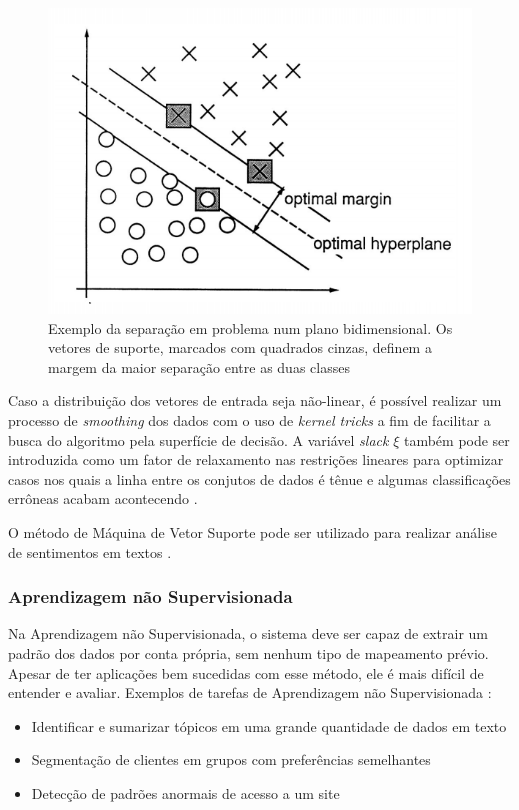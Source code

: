 \documentclass[
	12pt,				%
	openright,			%
	oneside,			%
	a4paper,			%
	english,			%
	spanish,			%
	brazil				%
	]{abntex2}
\begin{document}
\begin{figure}[!htb]
\centering
\includegraphics[scale=0.5]{svm_distribution}
\caption{Exemplo da separação em problema num plano bidimensional. Os vetores de suporte, marcados com quadrados cinzas, definem a margem da maior separação entre as duas classes \cite{cortes}}
\label{svm}
\end{figure}

	Caso a distribuição dos vetores de entrada seja não-linear, é possível realizar um processo de \emph{smoothing} dos dados com o uso de \emph{kernel tricks} a fim de facilitar a busca do algoritmo pela superfície de decisão. A variável \emph{slack} $\xi$ também pode ser introduzida como um fator de relaxamento nas restrições lineares para optimizar casos nos quais a linha entre os conjutos de dados é tênue e algumas classificações errôneas acabam acontecendo \cite{r_julian_heart}.
	
	O método de Máquina de Vetor Suporte pode ser utilizado para realizar análise de sentimentos em textos \cite{patil}.
	


	\subsubsection*{Aprendizagem não Supervisionada}
		Na Aprendizagem não Supervisionada, o sistema deve ser capaz de extrair um padrão dos dados por conta própria, sem nenhum tipo de mapeamento prévio. Apesar de ter aplicações bem sucedidas com esse método, ele é mais difícil de entender e avaliar. Exemplos de tarefas de Aprendizagem não Supervisionada \cite {guido_muller}: 
	\begin{itemize}
	 	\item Identificar e sumarizar tópicos em uma grande quantidade de dados em texto
		\item Segmentação de clientes em grupos com preferências semelhantes
		\item Detecção de padrões anormais de acesso a um site
	\end{itemize}
\end{document}
